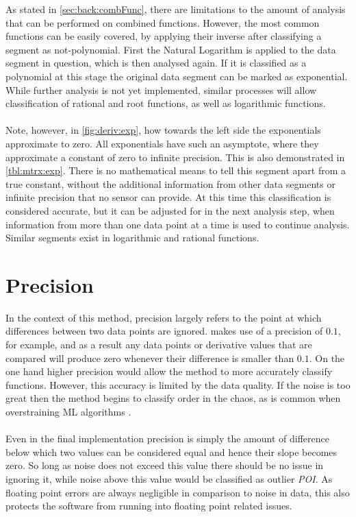 \documentclass[main.tex]{subfiles}
\begin{document}
      As stated in \cref{sec:back:combFunc}, there are limitations to the amount of analysis that can be performed on combined functions. However, the most common functions can be easily covered, by applying their inverse after classifying a segment as not-polynomial. First the Natural Logarithm is applied to the data segment in question, which is then analysed again. If it is classified as a polynomial at this stage the original data segment can be marked as exponential. While further analysis is not yet implemented, similar processes will allow classification of rational and root functions, as well as logarithmic functions.
      \\\\
      Note, however, in \cref{fig:deriv:exp}, how towards the left side the exponentials approximate to zero. All exponentials have such an asymptote, where they approximate a constant of zero to infinite precision. This is also demonstrated in \cref{tbl:mtrx:exp}. There is no mathematical means to tell this segment apart from a true constant, without the additional information from other data segments or infinite precision that no sensor can provide. At this time this classification is considered accurate, but it can be adjusted for in the next analysis step, when information from more than one data point at a time is used to continue analysis. Similar segments exist in logarithmic and rational functions.
      
      
      
  \section{Precision}
    
    In the context of this method, precision largely refers to the point at which differences between two data points are ignored.  makes use of a precision of $0.1$, for example, and as a result any data points or derivative values that are compared will produce zero whenever their difference is smaller than $0.1$. On the one hand higher precision would allow the method to more accurately classify functions. However, this accuracy is limited by the data quality. If the noise is too great then the method begins to classify order in the chaos, as is common when overstraining ML algorithms \cite{}. 
    \\\\
    Even in the final implementation precision is simply the amount of difference below which two values can be considered equal and hence their slope becomes zero. So long as noise does not exceed this value there should be no issue in ignoring it, while noise above this value would be classified as outlier \textit{POI}. As floating point errors are always negligible in comparison to noise in data, this also protects the software from running into floating point related issues.
%    
  
\end{document}
